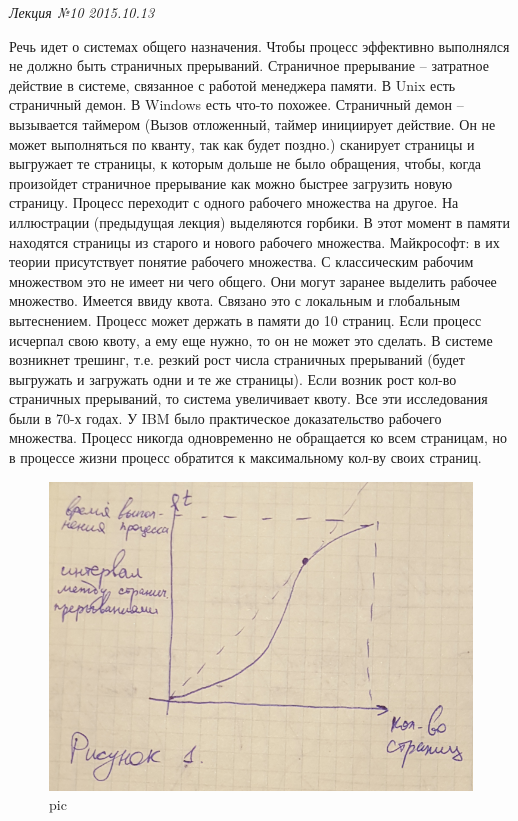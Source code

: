 \clearpage
\begin{flushright}
	\textit{Лекция №10}
	\textit{2015.10.13}
\end{flushright}

Речь идет о системах общего назначения.
Чтобы процесс эффективно выполнялся не должно быть страничных прерываний. Страничное прерывание – затратное действие в системе, связанное с работой менеджера памяти. 
В Unix есть страничный демон. В Windows есть что-то похожее. Страничный демон – вызывается таймером (Вызов отложенный, таймер инициирует действие. Он не может выполняться по кванту, так как будет поздно.) сканирует страницы и выгружает те страницы, к которым дольше не было обращения, чтобы, когда произойдет страничное прерывание как можно быстрее загрузить новую страницу.  
Процесс переходит с одного рабочего множества на другое. На иллюстрации (предыдущая лекция) выделяются горбики. В этот момент в памяти находятся страницы из старого и нового рабочего множества. 
Майкрософт: в их теории присутствует понятие рабочего множества. С классическим рабочим множеством это не имеет ни чего общего. Они могут заранее выделить рабочее множество. Имеется ввиду квота. Связано это с локальным и глобальным вытеснением. Процесс может держать в памяти до 10 страниц. Если процесс исчерпал свою квоту, а ему еще нужно, то он не может это сделать. В системе возникнет трешинг, т.е. резкий рост числа страничных прерываний (будет выгружать и загружать одни и те же страницы). Если возник рост кол-во страничных прерываний, то система увеличивает квоту.
Все эти исследования были в 70-х годах. У IBM было практическое доказательство рабочего множества. Процесс никогда одновременно не обращается ко всем страницам, но в процессе жизни процесс обратится к максимальному кол-ву своих страниц.

\begin{figure}[H]
    \centering
    \includegraphics[width=\textwidth]{pic/1.png}
    \caption{pic}
\end{figure}

